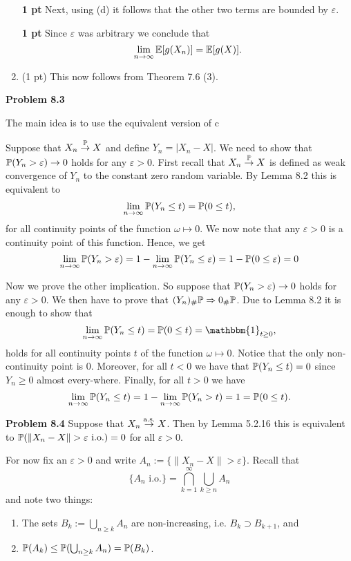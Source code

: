 \begin{enumerate}[label={(\alph*)}]
\textbf{1 pt} Next, using (d) it follows that the other two terms are bounded by $\varepsilon$.

\textbf{1 pt} Since $\varepsilon$ was arbitrary we conclude that
\[
	\lim_{n \to \infty} \mathbb E[g(X_n)] = \mathbb E[g(X)].
\]
\item (1 pt) This now follows from Theorem 7.6 (3).
\end{enumerate}

\bigskip

\textbf{Problem 8.3}

The main idea is to use the equivalent version of c

Suppose that $X_n \stackrel{\mathbb P}{\rightarrow} X$ and define $Y_n = |X_n - X|$. We need to show that $\mathbb P(Y_n > \varepsilon) \to 0$ holds for any $\varepsilon > 0$. First recall that $X_n \stackrel{\mathbb P}{\rightarrow} X$ is defined as weak convergence of $Y_n$ to the constant zero random variable. By Lemma 8.2 this is equivalent to 
\[
	\lim_{n \to \infty} \mathbb P(Y_n \le t) = \mathbb P(0 \le t),
\]
for all continuity points of the function $\omega \mapsto 0$. We now note that any $\varepsilon > 0$ is a continuity point of this function. Hence, we get
\[
	\lim_{n \to \infty} \mathbb P(Y_n > \varepsilon) = 1 - \lim_{n \to \infty} \mathbb P(Y_n \le \varepsilon) = 1 - \mathbb P(0 \le \varepsilon) = 0
\]

Now we prove the other implication. So suppose that $\mathbb P(Y_n > \varepsilon) \to 0$ holds for any $\varepsilon > 0$. We then have to prove that $(Y_n)_\# \mathbb P \Rightarrow 0_\# \mathbb P$. Due to Lemma 8.2 it is enough to show that
\[
	\lim_{n \to \infty} \bbP(Y_n \le t) = \bbP(0 \le t) = \mathbbm{1}_{t \ge 0},
\]
holds for all continuity points $t$ of the function $\omega \mapsto 0$. Notice that the only non-continuity point is $0$. Moreover, for all $t < 0$ we have that $\mathbb P(Y_n \le t) = 0$ since $Y_n \ge 0$ almost every-where. Finally, for all $t > 0$ we have
\[
	\lim_{n \to \infty} \mathbb P(Y_n \le t) = 1 - \lim_{n \to \infty} \mathbb P(Y_n > t) = 1 = \mathbb P(0 \le t). 
\]

\bigskip

\textbf{Problem 8.4}
Suppose that $X_n \stackrel{\mathrm{a.s.}}{\rightarrow} X$. Then by Lemma 5.2.16 this is equivalent to $\mathbb P(\|X_n - X\| > \varepsilon \text{ i.o.}) = 0$ for all $\varepsilon > 0$. 

For now fix an $\varepsilon > 0$ and write $A_n := \{\|X_n - X\| > \varepsilon\}$. Recall that
\[
	\{A_n \text{ i.o.}\} = \bigcap_{k = 1}^\infty \bigcup_{k \ge n} A_n
\]
and note two things:
\begin{enumerate}[label={(\alph*)}]
\item The sets $B_k := \bigcup_{n \ge k} A_n$ are non-increasing, i.e. $B_k \supset B_{k+1}$, and
\item $\mathbb P(A_k) \le \mathbb P(\bigcup_{n \ge k} A_n) = \mathbb P(B_k)$.
\end{enumerate}
 
